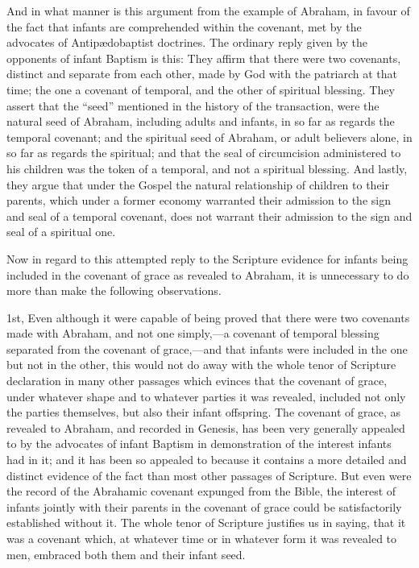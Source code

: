 \documentclass[]{book}
\begin{document}
And in what manner is this argument from the example of Abraham, in favour of the fact that infants are comprehended within the covenant, met by the advocates of Antipædobaptist doctrines. The ordinary reply given by the opponents of infant Baptism is this: They affirm that there were two covenants, distinct and separate from each other, made by God with the patriarch at that time; the one a covenant of temporal, and the other of spiritual blessing. They assert that the ``seed'' mentioned in the history of the transaction, were the natural seed of Abraham, including adults and infants, in so far as regards the temporal covenant; and the spiritual seed of Abraham, or adult believers alone, in so far as regards the spiritual; and that the seal of circumcision administered to his children was the token of a temporal, and not a spiritual blessing. And lastly, they argue that under the Gospel the natural relationship of children to their parents, which under a former economy warranted their admission to the sign and seal of a temporal covenant, does not warrant their admission to the sign and seal of a spiritual one.

Now in regard to this attempted reply to the Scripture evidence for infants being included in the covenant of grace as revealed to Abraham, it is unnecessary to do more than make the following observations.

1st, Even although it were capable of being proved that there were two covenants made with Abraham, and not one simply,---a covenant of temporal blessing separated from the covenant of grace,---and that infants were included in the one but not in the other, this would not do away with the whole tenor of Scripture declaration in many other passages which evinces that the covenant of grace, under whatever shape and to whatever parties it was revealed, included not only the parties themselves, but also their infant offspring. The covenant of grace, as revealed to Abraham, and recorded in Genesis, has been very generally appealed to by the advocates of infant Baptism in demonstration of the interest infants had in it; and it has been so appealed to because it contains a more detailed and distinct evidence of the fact than most other passages of Scripture. But even were the record of the Abrahamic covenant expunged from the Bible, the interest of infants jointly with their parents in the covenant of grace could be satisfactorily established without it. The whole tenor of Scripture justifies us in saying, that it was a covenant which, at whatever time or in whatever form it was revealed to men, embraced both them and their infant seed.
\end{document}
